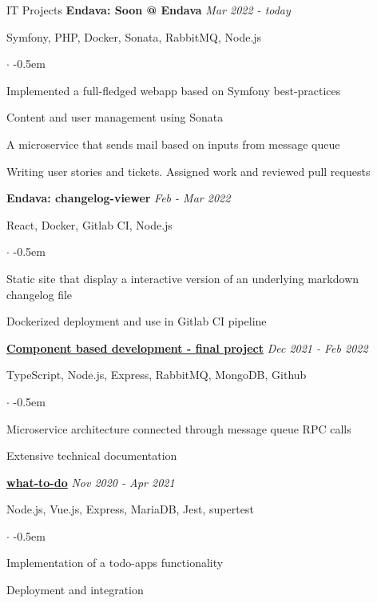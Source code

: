 \documentclass{cv}
\begin{document}
\begin{rSection}{IT Projects}
  \textbf{Endava: Soon @ Endava}
  \hfill
  {\em Mar 2022 - today}

  Symfony, PHP, Docker, Sonata, RabbitMQ, Node.js
  \begin{list}{$\cdot$}{}
    \itemsep -0.5em \vspace{-0.5em}
    \smallskip
    \item Implemented a full-fledged webapp based on Symfony best-practices
    \item Content and user management using Sonata
    \item A microservice that sends mail based on inputs from message queue
    \item Writing user stories and tickets. Assigned work and reviewed pull requests
  \end{list}

  \textbf{Endava: changelog-viewer}
  \hfill
  {\em Feb - Mar 2022}

  React, Docker, Gitlab CI, Node.js
  \begin{list}{$\cdot$}{}
    \itemsep -0.5em \vspace{-0.5em}
    \smallskip
    \item Static site that display a interactive version of an underlying markdown changelog file
    \item Dockerized deployment and use in Gitlab CI pipeline
  \end{list}

  \break

  \textbf{\href{https://github.com/htw-kbe-jneidel/main}{Component based development - final project}}
  \hfill
  {\em Dec 2021 - Feb 2022}

  TypeScript, Node.js, Express, RabbitMQ, MongoDB, Github
  \begin{list}{$\cdot$}{}
    \itemsep -0.5em \vspace{-0.5em}
    \smallskip
    \item Microservice architecture connected through message queue RPC calls
    \item Extensive technical documentation
  \end{list}

  \textbf{\href{https://github.com/jneidel/what-to-do}{what-to-do}}
  \hfill
  {\em Nov 2020 - Apr 2021}

  Node.js, Vue.js, Express, MariaDB, Jest, supertest

  \begin{list}{$\cdot$}{}
    \itemsep -0.5em \vspace{-0.5em} %
    \smallskip
    \item Implementation of a todo-apps functionality
    \item Deployment and integration
  \end{list}


\end{rSection}
\end{document}

